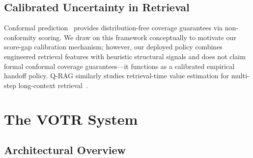 \documentclass[sigconf,anonymous,review]{acmart}
\begin{document}
\subsection{Calibrated Uncertainty in Retrieval}
Conformal prediction~\cite{shafer2008tutorial} provides distribution-free coverage
guarantees via non-conformity scoring.
We draw on this framework conceptually to motivate our score-gap calibration
mechanism; however, our deployed policy combines engineered retrieval features with
heuristic structural signals and does not claim formal conformal coverage
guarantees---it functions as a calibrated empirical handoff policy.
Q-RAG similarly studies retrieval-time value estimation for multi-step long-context
retrieval~\cite{qrag2026}.

\section{The VOTR System}

\subsection{Architectural Overview}
\end{document}
